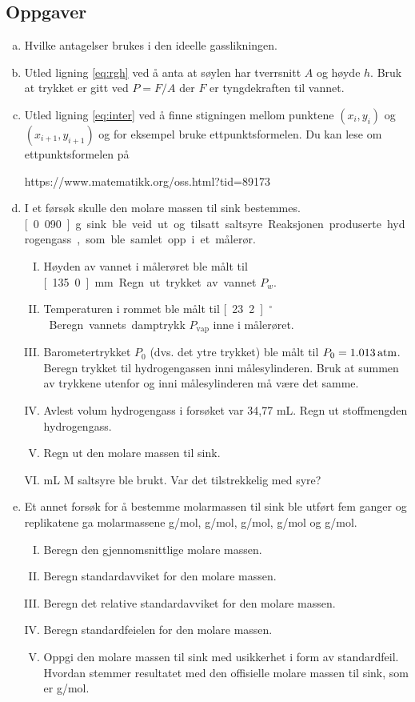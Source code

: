 \documentclass[12pt, a4]{article}
\newcommand{\degree}{\ensuremath{^\circ}}
\begin{document}
	\subsection{Oppgaver}
	\begin{enumerate}[(a)]
		\item Hvilke antagelser brukes i den ideelle gasslikningen.
		\item Utled ligning \eqref{eq:rgh} ved å anta at søylen har tverrsnitt $A$ og høyde $h$. Bruk at trykket er gitt ved $P=F/A$ der $F$ er tyngdekraften til vannet.	
		\item Utled ligning  \eqref{eq:inter} ved å finne stigningen mellom punktene $(x_i, y_i)$ og $(x_{i+1}, y_{i+1})$ og for eksempel bruke ettpunktsformelen. Du kan lese om ettpunktsformelen på
		
		https://www.matematikk.org/oss.html?tid=89173
		\item I et førsøk skulle den molare massen til sink bestemmes. \unit[0.090]{g} sink ble veid ut og tilsatt saltsyre. Reaksjonen produserte hydrogengass, som ble samlet opp i et målerør.
		\begin{enumerate}[I)]
			\item Høyden av vannet i målerøret ble målt til \unit[135.0]{mm}. Regn ut trykket av vannet $P_w$.
			\item Temperaturen i rommet ble målt til \unit[23.2]{\degree}. Beregn vannets damptrykk $P_\mathrm{vap}$ inne i målerøret.
			\item Barometertrykket $P_0$ (dvs. det ytre trykket) ble målt til $P_0=\unit[1.013]{atm}$. Beregn trykket til hydrogengassen inni målesylinderen. Bruk at summen av trykkene utenfor og inni målesylinderen må være det samme.
			\item Avlest volum hydrogengass i forsøket var 34,77 mL. Regn ut stoffmengden hydrogengass.
			\item Regn ut den molare massen til sink.
			\item \unit[10]{mL} \unit[6]{M} saltsyre ble brukt. Var det tilstrekkelig med syre?
		\end{enumerate}
		\item Et annet forsøk for å bestemme molarmassen til sink ble utført fem ganger og replikatene ga molarmassene \unit[65,40]{g/mol}, \unit[66,56]{g/mol}, \unit[65,60]{g/mol}, \unit[64,94]{g/mol} og \unit[65,19]{g/mol}.
		\begin{enumerate}[I)]
			\item Beregn den gjennomsnittlige molare massen.
			\item Beregn standardavviket for den molare massen.
			\item Beregn det relative standardavviket for den molare massen.
			\item Beregn standardfeielen for den molare massen.
			\item Oppgi den molare massen til sink med usikkerhet i form av standardfeil. Hvordan stemmer resultatet med den offisielle molare massen til sink, som er \unit[65,38]{g/mol}.
		\end{enumerate}
	\end{enumerate}
	
\end{document}
